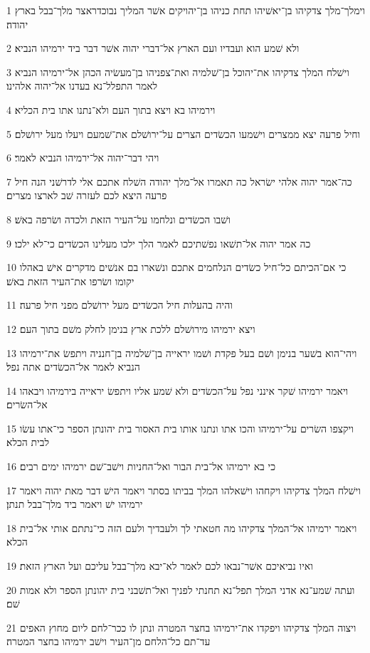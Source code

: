 \par 1 וימלך־מלך צדקיהו בן־יאשׁיהו תחת כניהו בן־יהויקים אשׁר המליך נבוכדראצר מלך־בבל בארץ יהודה׃
\par 2 ולא שׁמע הוא ועבדיו ועם הארץ אל־דברי יהוה אשׁר דבר ביד ירמיהו הנביא׃
\par 3 וישׁלח המלך צדקיהו את־יהוכל בן־שׁלמיה ואת־צפניהו בן־מעשׂיה הכהן אל־ירמיהו הנביא לאמר התפלל־נא בעדנו אל־יהוה אלהינו׃
\par 4 וירמיהו בא ויצא בתוך העם ולא־נתנו אתו בית הכליא׃
\par 5 וחיל פרעה יצא ממצרים וישׁמעו הכשׂדים הצרים על־ירושׁלם את־שׁמעם ויעלו מעל ירושׁלם׃
\par 6 ויהי דבר־יהוה אל־ירמיהו הנביא לאמר׃
\par 7 כה־אמר יהוה אלהי ישׂראל כה תאמרו אל־מלך יהודה השׁלח אתכם אלי לדרשׁני הנה חיל פרעה היצא לכם לעזרה שׁב לארצו מצרים׃
\par 8 ושׁבו הכשׂדים ונלחמו על־העיר הזאת ולכדה ושׂרפה באשׁ׃
\par 9 כה אמר יהוה אל־תשׁאו נפשׁתיכם לאמר הלך ילכו מעלינו הכשׂדים כי־לא ילכו׃
\par 10 כי אם־הכיתם כל־חיל כשׂדים הנלחמים אתכם ונשׁארו בם אנשׁים מדקרים אישׁ באהלו יקומו ושׂרפו את־העיר הזאת באשׁ׃
\par 11 והיה בהעלות חיל הכשׂדים מעל ירושׁלם מפני חיל פרעה׃
\par 12 ויצא ירמיהו מירושׁלם ללכת ארץ בנימן לחלק משׁם בתוך העם׃
\par 13 ויהי־הוא בשׁער בנימן ושׁם בעל פקדת ושׁמו יראייה בן־שׁלמיה בן־חנניה ויתפשׂ את־ירמיהו הנביא לאמר אל־הכשׂדים אתה נפל׃
\par 14 ויאמר ירמיהו שׁקר אינני נפל על־הכשׂדים ולא שׁמע אליו ויתפשׂ יראייה בירמיהו ויבאהו אל־השׂרים׃
\par 15 ויקצפו השׂרים על־ירמיהו והכו אתו ונתנו אותו בית האסור בית יהונתן הספר כי־אתו עשׂו לבית הכלא׃
\par 16 כי בא ירמיהו אל־בית הבור ואל־החניות וישׁב־שׁם ירמיהו ימים רבים׃
\par 17 וישׁלח המלך צדקיהו ויקחהו וישׁאלהו המלך בביתו בסתר ויאמר הישׁ דבר מאת יהוה ויאמר ירמיהו ישׁ ויאמר ביד מלך־בבל תנתן׃
\par 18 ויאמר ירמיהו אל־המלך צדקיהו מה חטאתי לך ולעבדיך ולעם הזה כי־נתתם אותי אל־בית הכלא׃
\par 19 ואיו נביאיכם אשׁר־נבאו לכם לאמר לא־יבא מלך־בבל עליכם ועל הארץ הזאת׃
\par 20 ועתה שׁמע־נא אדני המלך תפל־נא תחנתי לפניך ואל־תשׁבני בית יהונתן הספר ולא אמות שׁם׃
\par 21 ויצוה המלך צדקיהו ויפקדו את־ירמיהו בחצר המטרה ונתן לו ככר־לחם ליום מחוץ האפים עד־תם כל־הלחם מן־העיר וישׁב ירמיהו בחצר המטרה׃

